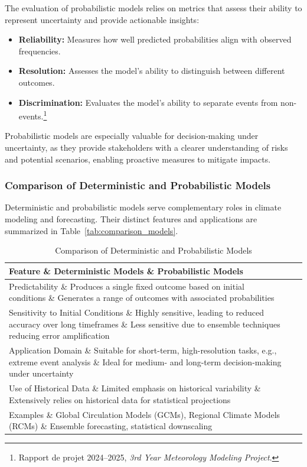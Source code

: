 The evaluation of probabilistic models relies on metrics that assess their ability to represent uncertainty and provide actionable insights:
\begin{itemize}
    \item \textbf{Reliability:} Measures how well predicted probabilities align with observed frequencies.
    \item \textbf{Resolution:} Assesses the model’s ability to distinguish between different outcomes.
    \item \textbf{Discrimination:} Evaluates the model’s ability to separate events from non-events.\footnote{Rapport de projet 2024–2025, \textit{3rd Year Meteorology Modeling Project}.}
\end{itemize}

Probabilistic models are especially valuable for decision-making under uncertainty, as they provide stakeholders with a clearer understanding of risks and potential scenarios, enabling proactive measures to mitigate impacts.

\subsubsection{Comparison of Deterministic and Probabilistic Models}
Deterministic and probabilistic models serve complementary roles in climate modeling and forecasting. Their distinct features and applications are summarized in Table~\ref{tab:comparison_models}.

\begin{table}[h!]
    \centering
    \caption{Comparison of Deterministic and Probabilistic Models}
    \begin{tabular}{@{}p{5cm}p{5cm}p{5cm}@{}}
    \toprule
    \textbf{Feature} \& \textbf{Deterministic Models} \& \textbf{Probabilistic Models} \\
    \midrule
    Predictability \& Produces a single fixed outcome based on initial conditions \& Generates a range of outcomes with associated probabilities \\
    \addlinespace
    Sensitivity to Initial Conditions \& Highly sensitive, leading to reduced accuracy over long timeframes \& Less sensitive due to ensemble techniques reducing error amplification \\
    \addlinespace
    Application Domain \& Suitable for short-term, high-resolution tasks, e.g., extreme event analysis \& Ideal for medium- and long-term decision-making under uncertainty \\
    \addlinespace
    Use of Historical Data \& Limited emphasis on historical variability \& Extensively relies on historical data for statistical projections \\
    \addlinespace
    Examples \& Global Circulation Models (GCMs), Regional Climate Models (RCMs) \& Ensemble forecasting, statistical downscaling \\
    \bottomrule
    \end{tabular}
\end{table}

